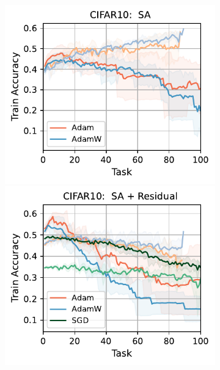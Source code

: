 \begin{figure}[htb!]
{\begin{figure}[t]
{{        \includegraphics[width=\textwidth]{figs/Accuracy/image/attention/cifar10_40.pdf}
        \includegraphics[width=\textwidth]{figs/Accuracy/image/attention_residual/cifar10_40.pdf}
}}
\end{figure}}
\end{figure}
